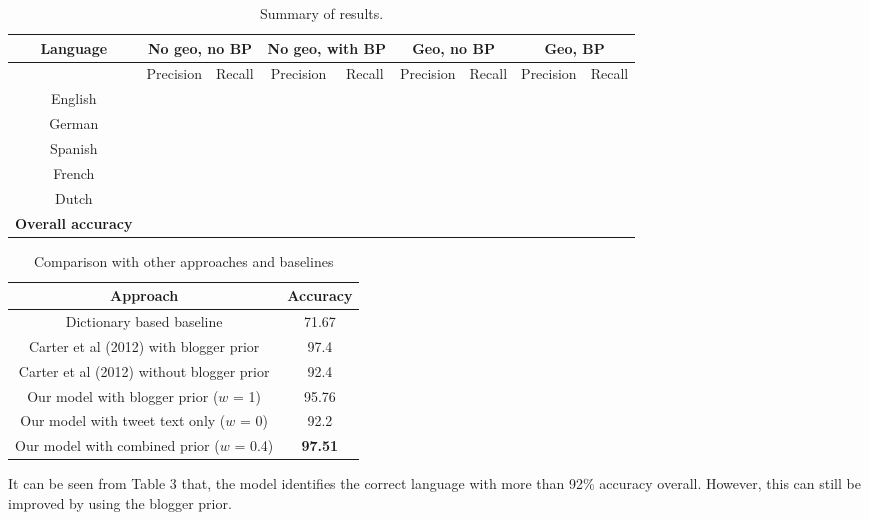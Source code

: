 \documentclass[11pt]{article}
\begin{document}
\begin{table}
\begin{center}
\small
\begin{tabular}{|c||c|c||c|c||c|c||c|c|}
\hline
\textbf{Language} & \multicolumn{2}{|c||}{\textbf {No geo, no BP}} & \multicolumn{2}{|c||}{\textbf{No geo, with BP}} & \multicolumn{2}{|c||}{\textbf{Geo, no BP}} & \multicolumn{2}{|c|}{\textbf{Geo, BP}} \\
\hline
 & Precision & Recall & Precision & Recall & Precision & Recall & Precision & Recall \\
\hline
English & & & & & & & & \\
German & & & & & & & & \\
Spanish & & & & & & & & \\
French & & & & & & & & \\
Dutch & & & & & & & & \\
\hline
\textbf{Overall accuracy} & \multicolumn{2}{|c||}{} & \multicolumn{2}{|c||}{} & \multicolumn{2}{|c||}{} & \multicolumn{2}{c|}{} \\
\hline
\end{tabular}
\caption{\footnotesize Summary of results.}
\end{center}
\end{table}

\begin{table}
\begin{center}
\small
\begin{tabular}{|c|c|}
\hline
\textbf{Approach} & \textbf{Accuracy} \\
\hline
Dictionary based baseline & 71.67 \\
Carter et al (2012) with blogger prior & 97.4 \\
Carter et al (2012) without blogger prior & 92.4 \\
Our model with blogger prior ($w$ = 1) & 95.76 \\
Our model with tweet text only ($w$ = 0)& 92.2 \\
Our model with combined prior ($w$ = 0.4) & \textbf{97.51} \\

\hline
\end{tabular}
\caption{\footnotesize Comparison with other approaches and baselines}
\end{center}
\end{table}


It can be seen from Table 3 that, the model identifies the correct language with more than 92\% accuracy overall. However, this can still be improved by using the blogger prior.
\end{document}
